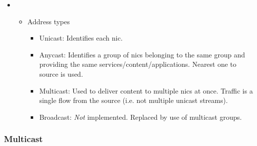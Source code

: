 \begin{itemize}
\begin{itemize}
\begin{itemize}
        \end{itemize}
    \end{itemize}
    \item {}
    \begin{itemize}
        \item Address types
        \begin{itemize}
            \item Unicast: Identifies each \gls{nic}.
            \item Anycast: Identifies a group of \glspl{nic} belonging to the same group and providing the same services/content/applications. Nearest one to source is used.
            \item Multicast: Used to deliver content to multiple \glspl{nic} at once. Traffic is a single flow from the source (i.e. not multiple unicast streams).
            \item Broadcast: \textit{Not} implemented. Replaced by use of multicast groups.
        \end{itemize}
    \end{itemize}
\end{itemize}

\subsubsection{Multicast}

